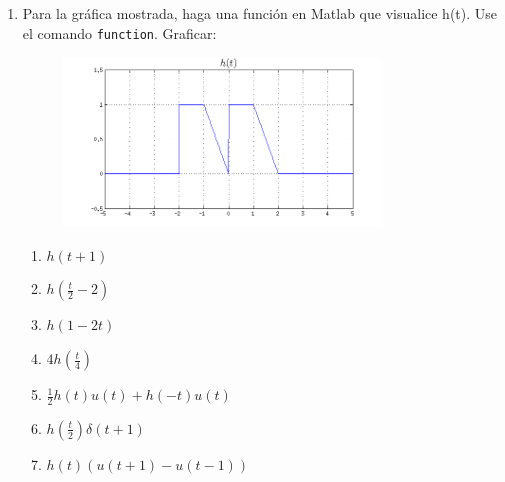 \documentclass[a4paper,11pt,twoside,final]{article}
\begin{document}
\begin{enumerate}
        \item Para la gráfica mostrada, haga una función en Matlab que
        visualice h(t). Use el comando \texttt{function}. Graficar:

        \begin{figure}[H]
            \begin{center}
                \includegraphics[width=0.80\textwidth]{./lab2prob7.png}
            \end{center}
        \end{figure}

        \begin{enumerate}
            \item $h\left(t+1\right)$
            \item $h\left(\frac{t}{2}-2\right)$
            \item $h\left(1-2t\right)$
            \item $4h\left(\frac{t}{4}\right)$
            \item $\frac{1}{2}h\left(t\right)u\left(t\right) + h\left(-t\right)u\left(t\right)$
            \item $h\left(\frac{t}{2}\right)\delta\left(t+1\right)$
            \item $h\left(t\right)\left(u\left(t+1\right)-u\left(t-1\right)\right)$
        \end{enumerate}
    \end{enumerate}
\end{document}
